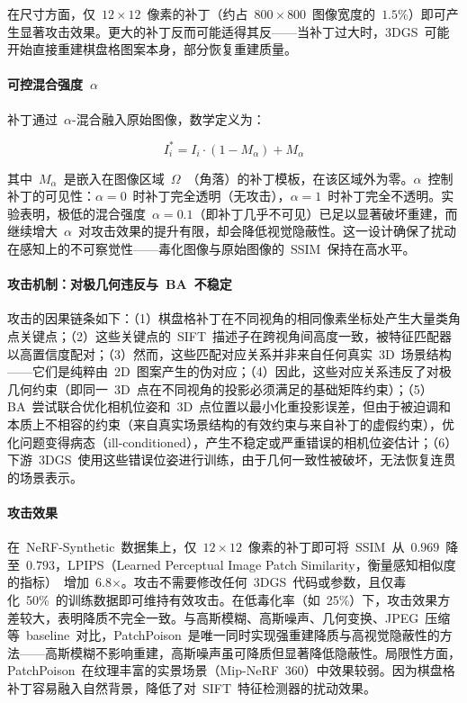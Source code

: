 在尺寸方面，仅~$12\times12$~像素的补丁（约占~$800\times800$~图像宽度的~$1.5\%$）即可产生显著攻击效果。更大的补丁反而可能适得其反——当补丁过大时，3DGS~可能开始直接重建棋盘格图案本身，部分恢复重建质量。

\paragraph{可控混合强度~$\alpha$}

补丁通过~$\alpha$-混合融入原始图像，数学定义为：

\begin{equation}
I_i^* = I_i \cdot (1 - M_\alpha) + M_\alpha
\end{equation}

其中~$M_\alpha$~是嵌入在图像区域~$\Omega$~（角落）的补丁模板，在该区域外为零。$\alpha$~控制补丁的可见性：$\alpha=0$~时补丁完全透明（无攻击），$\alpha=1$~时补丁完全不透明。实验表明，极低的混合强度~$\alpha=0.1$（即补丁几乎不可见）已足以显著破坏重建，而继续增大~$\alpha$~对攻击效果的提升有限，却会降低视觉隐蔽性。这一设计确保了扰动在感知上的不可察觉性——毒化图像与原始图像的~SSIM~保持在高水平。

\paragraph{攻击机制：对极几何违反与~BA~不稳定}

攻击的因果链条如下：（1）棋盘格补丁在不同视角的相同像素坐标处产生大量类角点关键点；（2）这些关键点的~SIFT~描述子在跨视角间高度一致，被特征匹配器以高置信度配对；（3）然而，这些匹配对应关系并非来自任何真实~3D~场景结构——它们是纯粹由~2D~图案产生的伪对应；（4）因此，这些对应关系违反了对极几何约束（即同一~3D~点在不同视角的投影必须满足的基础矩阵约束）；（5）BA~尝试联合优化相机位姿和~3D~点位置以最小化重投影误差，但由于被迫调和本质上不相容的约束（来自真实场景结构的有效约束与来自补丁的虚假约束），优化问题变得病态（ill-conditioned），产生不稳定或严重错误的相机位姿估计；（6）下游~3DGS~使用这些错误位姿进行训练，由于几何一致性被破坏，无法恢复连贯的场景表示。

\paragraph{攻击效果}

在~NeRF-Synthetic~数据集上，仅~$12\times12$~像素的补丁即可将~SSIM~从~$0.969$~降至~$0.793$，LPIPS（Learned Perceptual Image Patch Similarity，衡量感知相似度的指标）~增加~6.8$\times$。攻击不需要修改任何~3DGS~代码或参数，且仅毒化~50\%~的训练数据即可维持有效攻击。在低毒化率（如~25\%）下，攻击效果方差较大，表明降质不完全一致。与高斯模糊、高斯噪声、几何变换、JPEG~压缩等~baseline~对比，PatchPoison~是唯一同时实现强重建降质与高视觉隐蔽性的方法——高斯模糊不影响重建，高斯噪声虽可降质但显著降低隐蔽性。局限性方面，PatchPoison~在纹理丰富的实景场景（Mip-NeRF~360）中效果较弱。因为棋盘格补丁容易融入自然背景，降低了对~SIFT~特征检测器的扰动效果。

